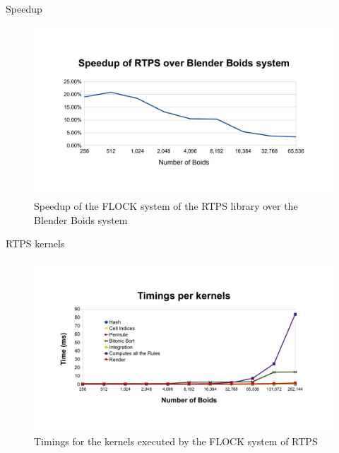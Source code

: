 \documentclass[red]{beamer}
\begin{document}
\begin{frame}{Speedup} 
	\begin{figure}[htbp]
	\begin{center}
	\includegraphics[scale=0.30]{../figures/speedup.pdf}
	\caption{Speedup of the FLOCK system of the RTPS library over the Blender Boids system}
	\label{speedup}
	\end{center}
	\end{figure}
\end{frame}

\begin{frame}{RTPS kernels}
	\begin{figure}[htbp]
	\begin{center}
	\includegraphics[scale=0.30]{../figures/kernelsPlot.pdf}
	\caption{Timings for the kernels executed by the FLOCK system of RTPS}
	\label{kernelBench}
	\end{center}
	\end{figure}
\end{frame}


\end{document}
